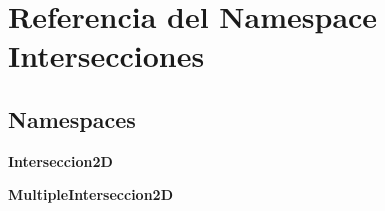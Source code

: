 \section{Referencia del Namespace Intersecciones}
\label{namespaceIntersecciones}
\subsection*{Namespaces}
\begin{DoxyCompactItemize}
\item 
{\bf Interseccion2\-D}
\item 
{\bf Multiple\-Interseccion2\-D}
\end{DoxyCompactItemize}
